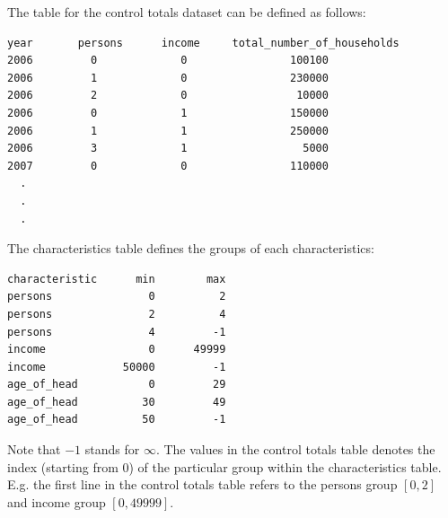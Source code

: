\begin{figure}
\begin{center}
\end{center}
\end{figure}

The table for the control totals dataset can be
defined as follows:
\begin{verbatim}
year       persons      income     total_number_of_households
2006         0             0                100100
2006         1             0                230000
2006         2             0                 10000
2006         0             1                150000
2006         1             1                250000
2006         3             1                  5000
2007         0             0                110000
  .
  .
  .
\end{verbatim}
The characteristics table defines the groups of each characteristics:
\begin{verbatim}
characteristic      min        max
persons               0          2
persons               2          4
persons               4         -1
income                0      49999
income            50000         -1
age_of_head           0         29
age_of_head          30         49
age_of_head          50         -1
\end{verbatim}
Note that $-1$ stands for $\infty$. The values in the control totals table
denotes the index (starting from 0) of the particular group within the
characteristics table. E.g. the first line in the control totals table refers
to the persons group $[0,2]$ and income group $[0,49999]$.

